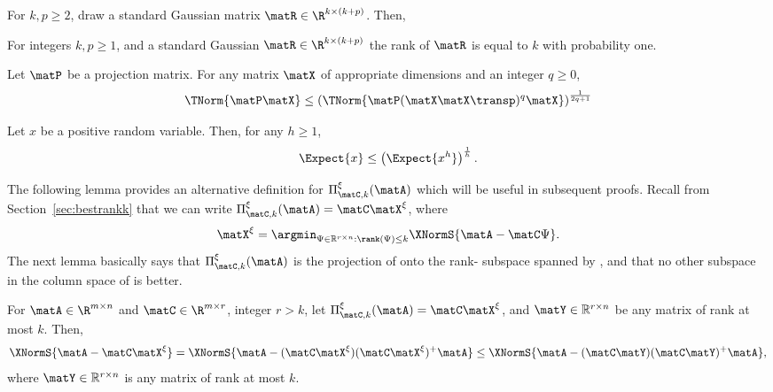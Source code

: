 \begin{lemma}  \label{prop2a}
For $k, p \geq 2$, draw a standard Gaussian matrix $\matR \in \R^{k \times (k+p)}$. Then,
\end{lemma}
\begin{lemma}  \label{prop3}
For integers $k,p \geq 1$, and a standard Gaussian $\matR \in \R^{k \times (k+p)}$ the rank of $\matR$ is equal to $k$ with probability one.
\end{lemma}
\begin{lemma}  \label{projection}
Let $\matP$ be a projection matrix. For any matrix $\matX$ of appropriate dimensions and an integer $q\ge 0$,
$$ \TNorm{\matP \matX} \le \left( \TNorm{ \matP (\matX \matX\transp)^q \matX  }  \right)^{\frac{1}{2q+1}} $$
\end{lemma}
\begin{lemma}  \label{prop0}
Let $x$ be a positive random variable. Then, for any $h \ge 1$,
$$\Expect{ x } \leq \left( \Expect{ x^h } \right)^{\frac{1}{h}}.$$
\end{lemma}
\noindent The following lemma provides an alternative definition for $\Pi_{\matC,k}^{\xi}(\matA)$ which will be useful in subsequent proofs.
Recall from Section~\ref{sec:bestrankk} that we can write
$\Pi_{\matC,k}^\xi(\matA)= \matC\matX^\xi$, where
$$
\matX^\xi =
\argmin_{\Psi \in \mathbb{R}^{r \times n}:\rank(\Psi)\leq k}\XNormS{\matA-\matC\Psi}.
$$
The next lemma basically says that $\Pi_{\matC,k}^\xi(\matA)$ is the projection
of \math{\matA} onto the rank- subspace spanned by
\math{\matC\matX^\xi}, and that no other subspace in the column space of
\math{\matC}   is better.
\begin{lemma}\label{lem:PPD1}
For $\matA \in {\R}^{m \times n}$ and $\matC \in {\R}^{m \times r}$,
integer $r> k$, let
$\Pi_{\matC,k}^\xi(\matA)= \matC\matX^\xi$, and
$\matY\in \mathbb{R}^{r \times n}$ be any matrix of rank at most $k$.
Then,
$$\XNormS{\matA-\matC\matX^\xi} = \XNormS{\matA-(\matC\matX^\xi)
(\matC\matX^\xi)^+\matA} \leq \XNormS{\matA-(\matC\matY)(\matC\matY)^+\matA},$$
where $\matY \in \mathbb{R}^{r \times n}$ is any matrix of rank at most $k$.
\end{lemma}

